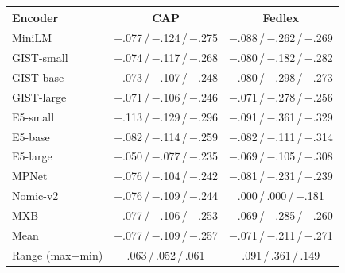 \vspace{1pt}
\begin{tabular}{lcc}
\toprule
Encoder & \multicolumn{1}{c}{CAP} & \multicolumn{1}{c}{Fedlex} \\
\midrule
MiniLM & $-$.077\,/\,$-$.124\,/\,$-$.275 & $-$.088\,/\,$-$.262\,/\,$-$.269 \\
\addlinespace[1pt]
GIST-small & $-$.074\,/\,$-$.117\,/\,$-$.268 & $-$.080\,/\,$-$.182\,/\,$-$.282 \\
GIST-base & $-$.073\,/\,$-$.107\,/\,$-$.248 & $-$.080\,/\,$-$.298\,/\,$-$.273 \\
GIST-large & $-$.071\,/\,$-$.106\,/\,$-$.246 & $-$.071\,/\,$-$.278\,/\,$-$.256 \\
\addlinespace[1pt]
E5-small & $-$.113\,/\,$-$.129\,/\,$-$.296 & $-$.091\,/\,$-$.361\,/\,$-$.329 \\
E5-base & $-$.082\,/\,$-$.114\,/\,$-$.259 & $-$.082\,/\,$-$.111\,/\,$-$.314 \\
E5-large & $-$.050\,/\,$-$.077\,/\,$-$.235 & $-$.069\,/\,$-$.105\,/\,$-$.308 \\
\addlinespace[1pt]
MPNet & $-$.076\,/\,$-$.104\,/\,$-$.242 & $-$.081\,/\,$-$.231\,/\,$-$.239 \\
Nomic-v2 & $-$.076\,/\,$-$.109\,/\,$-$.244 & .000\,/\,.000\,/\,$-$.181 \\
MXB & $-$.077\,/\,$-$.106\,/\,$-$.253 & $-$.069\,/\,$-$.285\,/\,$-$.260 \\
\midrule
Mean & $-$.077\,/\,$-$.109\,/\,$-$.257 & $-$.071\,/\,$-$.211\,/\,$-$.271 \\
Range (max$-$min) & .063\,/\,.052\,/\,.061 & .091\,/\,.361\,/\,.149 \\
\bottomrule
\end{tabular}

